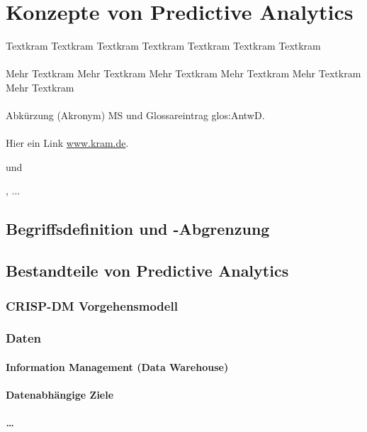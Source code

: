 \chapter{Konzepte von Predictive Analytics}
\label{part:Konzepte_PA}

Textkram Textkram Textkram Textkram Textkram Textkram Textkram \\ \\
Mehr Textkram Mehr Textkram Mehr Textkram Mehr Textkram Mehr Textkram Mehr
Textkram \\ \\
Abkürzung (Akronym) \gls{MS} und Glossareintrag \gls{glos:AntwD}. \\ \\
Hier ein Link \url{www.kram.de}.

\cite{Thapa_Parycek} und \cite{Mergel}

\cite{Bijma}, ...

\section{Begriffsdefinition und -Abgrenzung}

\section{Bestandteile von Predictive Analytics}

\subsection{CRISP-DM Vorgehensmodell}

\subsection{Daten}

\subsubsection{Information Management (Data Warehouse)}

\subsubsection{Datenabhängige Ziele}

\paragraph{\ldots}

